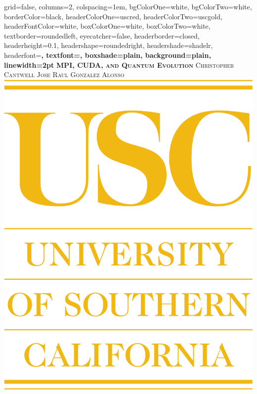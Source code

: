 \documentclass[portrait,paperwidth=24in,paperheight=36in,fontscale=0.5]{baposter}
\begin{document}

\begin{poster}%
  {
  grid=false,
  columns=2,
  colspacing=1em,
  bgColorOne=white,
  bgColorTwo=white,
  borderColor=black,
  headerColorOne=uscred,
  headerColorTwo=uscgold,
  headerFontColor=white,
  boxColorOne=white,
  boxColorTwo=white,
  textborder=roundedleft,
  eyecatcher=false,
  headerborder=closed,
  headerheight=0.1\textheight,
  headershape=roundedright,
  headershade=shadelr,
  headerfont=\Large\bf\textsc, %
  textfont={\setlength{\parindent}{1.5em}},
  boxshade=plain,
  background=plain,
  linewidth=2pt
  }%
  {}
  {\bf\textsc{MPI, CUDA, and Quantum Evolution}\vspace{0.5em}}
  {\textsc{Christopher Cantwell \hspace{14.0em} Jose Raul Gonzalez Alonso}\\ }
  {%
    \includegraphics[scale=0.2]{USC.pdf}
}
\end{poster}
\end{document}
